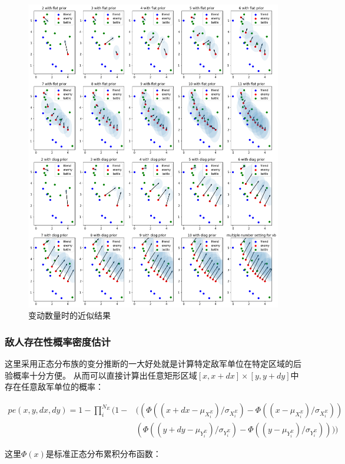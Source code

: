 \documentclass{sicnuthesis}
\begin{document}
\begin{figure}[htb]
\includegraphics[width=0.99\linewidth]{big_vb.png}
\caption{变动数量时的近似结果}
\label{fig:bigVb}
\end{figure}

\subsubsection{敌人存在性概率密度估计}


这里采用正态分布族的变分推断的一大好处就是计算特定敌军单位在特定区域的后验概率十分方便。
从而可以直接计算出任意矩形区域$[x,x+dx]\times[y,y+dy]$中存在任意敌军单位的概率：

\begin{align*}
pe(x,y,dx,dy) = 1-
\prod_i^{N_E}
(1-
& ((\Phi((x + dx - \mu_{X^E_i})/\sigma_{X^E_i}) - \Phi((x - \mu_{X^E_i})/\sigma_{X^E_i})) \\
&  (\Phi((y + dy - \mu_{Y^E_i})/\sigma_{Y^E_i}) - \Phi((y - \mu_{Y^E_i})/\sigma_{Y^E_i})))
)
\end{align*}


这里$\Phi(x)$是标准正态分布累积分布函数：
\end{document}
